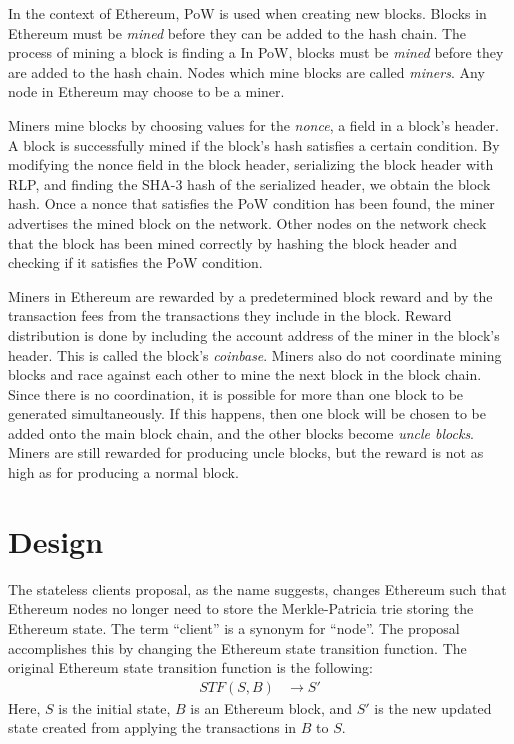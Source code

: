 \documentclass[12pt]{article}
\begin{document}
In the context of Ethereum, PoW is used when creating new blocks. Blocks in Ethereum must be \emph{mined} before they can be added to the hash chain. The process of mining a block is finding a
In PoW, blocks must be \emph{mined} before they are added to the hash chain. Nodes which mine blocks are called \emph{miners}. Any node in Ethereum may choose to be a miner.

Miners mine blocks by choosing values for the \emph{nonce}, a field in a block's header. A block is successfully mined if the block's hash satisfies a certain condition. By modifying the nonce field in the block header, serializing the block header with RLP, and finding the SHA-3 hash of the serialized header, we obtain the block hash. Once a nonce that satisfies the PoW condition has been found, the miner advertises the mined block on the network. Other nodes on the network check that the block has been mined correctly by hashing the block header and checking if it satisfies the PoW condition.

Miners in Ethereum are rewarded by a predetermined block reward and by the transaction fees from the transactions they include in the block. Reward distribution is done by including the account address of the miner in the block's header. This is called the block's \emph{coinbase}. Miners also do not coordinate mining blocks and race against each other to mine the next block in the block chain. Since there is no coordination, it is possible for more than one block to be generated simultaneously. If this happens, then one block will be chosen to be added onto the main block chain, and the other blocks become \emph{uncle blocks}. Miners are still rewarded for producing uncle blocks, but the reward is not as high as for producing a normal block.


\section{Design}

The stateless clients proposal, as the name suggests, changes Ethereum such that Ethereum nodes no longer need to store the Merkle-Patricia trie storing the Ethereum state. The term ``client'' is a synonym for ``node''. The proposal accomplishes this by changing the Ethereum state transition function. The original Ethereum state transition function is the following:
\begin{align*}
  STF(S, B) &\to S'
\end{align*}
Here, $S$ is the initial state, $B$ is an Ethereum block, and $S'$ is the new updated state created from applying the transactions in $B$ to $S$.
\end{document}
